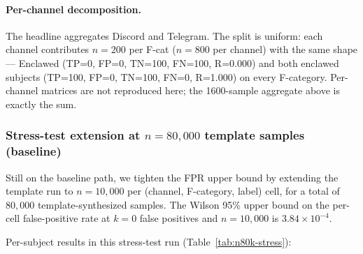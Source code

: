 \documentclass[11pt]{article}
\begin{document}
\paragraph{Per-channel decomposition.} The headline aggregates Discord
and Telegram. The split is uniform: each channel contributes
$n=200$ per F-cat ($n=800$ per channel) with the same shape ---
Enclawed (TP=0, FP=0, TN=100, FN=100, R=0.000) and both enclawed
subjects (TP=100, FP=0, TN=100, FN=0, R=1.000) on every F-category.
Per-channel matrices are not reproduced here; the 1600-sample
aggregate above is exactly the sum.

\subsubsection{Stress-test extension at $n = 80{,}000$ template samples
(baseline)}

Still on the baseline path, we tighten the FPR upper bound by extending the
template run to $n = 10{,}000$ per (channel, F-category, label) cell, for a
total of $80{,}000$ template-synthesized samples. The Wilson 95\% upper
bound on the per-cell false-positive rate at $k = 0$ false positives and
$n = 10{,}000$ is $3.84 \times 10^{-4}$.

Per-subject results in this stress-test run
(Table~\ref{tab:n80k-stress}):
\end{document}
